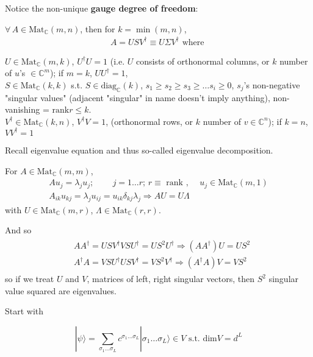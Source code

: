 \documentclass[10pt]{amsart}
\begin{document}
\begin{multicols*}{2}
Notice the non-unique \textbf{gauge degree of freedom}:

$\forall \, A \in \text{Mat}_{\mathbb{C}}(m,n)$, then for $k = \min{(m,n)}$, 
\begin{equation}
\begin{gathered}
A = U SV^{\dagger} \equiv U \Sigma V^{\dagger} \text{ where }
\end{gathered}
\end{equation}

$U \in \text{Mat}_{\mathbb{C}}(m,k)$, $U^{\dagger} U =1$ (i.e. $U$ consists of orthonormal columns, or $k$ number of $u$'s $\in \mathbb{C}^m$); if $m=k$, $UU^{\dagger} = 1$, \\
$S \in \text{Mat}_{\mathbb{C}}(k,k)$ s.t. $S \in \text{diag}_{\mathbb{C}}(k)$, $s_1 \geq s_2 \geq s_3 \geq \dots s_i \geq 0$, $s_j$'s non-negative "singular values" (adjacent "singular" in name doesn't imply anything), non-vanishing = $\text{rank} r \leq k$. \\
$V^{\dagger} \in \text{Mat}_{\mathbb{C}}(k,n)$, $V^{\dagger} V = 1$, (orthonormal rows, or $k$ number of $v\in \mathbb{C}^n$); if $k=n $, $VV^{\dagger} = 1$

Recall eigenvalue equation and thus so-called eigenvalue decomposition.

For $A \in \text{Mat}_{\mathbb{C}}(m,m)$, 
\[
\begin{gathered}
	Au_j = \lambda_j u_j ; \qquad \, j =1 \dots r ; \, r \equiv \text{ rank }, \quad \, u_j \in \text{Mat}_{\mathbb{C}}(m, 1) \\
	A_{ik} u_{kj} = \lambda_j u_{ij} = u_{ik} \delta_{kj} \lambda_j \Longrightarrow AU = U \Lambda
\end{gathered}
\]
with $U \in \text{Mat}_{\mathbb{C}}(m, r)$, $\Lambda \in \text{Mat}_{\mathbb{C}}(r, r)$.

And so
\[
\begin{gathered}
\begin{aligned}
& AA^{\dagger} = USV^{\dagger} VSU^{\dagger} = US^2 U^{\dagger} \Longrightarrow (AA^{\dagger})U = US^2 \\ 
& A^{\dagger} A = VSU^{\dagger} U SV^{\dagger} = VS^2 V^{\dagger} \Longrightarrow (A^{\dagger}A)V = VS^2
\end{aligned}
\end{gathered}
\]
so if we treat $U$ and $V$, matrices of left, right singular vectors, then $S^2$ singular value squared are eigenvalues.

Start with 

\begin{equation}
| \psi \rangle = \sum_{\sigma_1 \dots \sigma_L} c^{\sigma_1 \dots \sigma_L} | \sigma_1 \dots \sigma_L \rangle \in V \text{ s.t. } \text{dim} V = d^L
\end{equation}


\end{multicols*}
\end{document}
